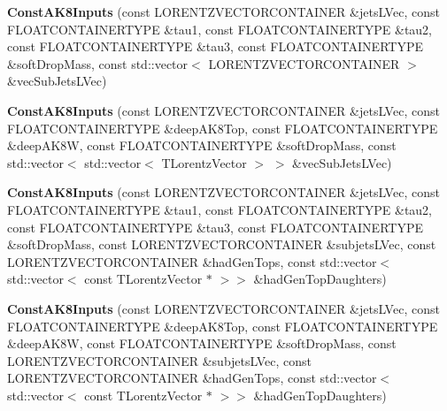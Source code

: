 \begin{DoxyCompactItemize}
\item 
\hypertarget{classttUtility_1_1ConstAK8Inputs_aab5da3d6e7ce53451fb17b1b45f7b957}{{\bfseries Const\-A\-K8\-Inputs} (const L\-O\-R\-E\-N\-T\-Z\-V\-E\-C\-T\-O\-R\-C\-O\-N\-T\-A\-I\-N\-E\-R \&jets\-L\-Vec, const F\-L\-O\-A\-T\-C\-O\-N\-T\-A\-I\-N\-E\-R\-T\-Y\-P\-E \&tau1, const F\-L\-O\-A\-T\-C\-O\-N\-T\-A\-I\-N\-E\-R\-T\-Y\-P\-E \&tau2, const F\-L\-O\-A\-T\-C\-O\-N\-T\-A\-I\-N\-E\-R\-T\-Y\-P\-E \&tau3, const F\-L\-O\-A\-T\-C\-O\-N\-T\-A\-I\-N\-E\-R\-T\-Y\-P\-E \&soft\-Drop\-Mass, const std\-::vector$<$ L\-O\-R\-E\-N\-T\-Z\-V\-E\-C\-T\-O\-R\-C\-O\-N\-T\-A\-I\-N\-E\-R $>$ \&vec\-Sub\-Jets\-L\-Vec)}\label{classttUtility_1_1ConstAK8Inputs_aab5da3d6e7ce53451fb17b1b45f7b957}

\item 
\hypertarget{classttUtility_1_1ConstAK8Inputs_a3dc8cd9d418163e8d9c8fccb666cc74a}{{\bfseries Const\-A\-K8\-Inputs} (const L\-O\-R\-E\-N\-T\-Z\-V\-E\-C\-T\-O\-R\-C\-O\-N\-T\-A\-I\-N\-E\-R \&jets\-L\-Vec, const F\-L\-O\-A\-T\-C\-O\-N\-T\-A\-I\-N\-E\-R\-T\-Y\-P\-E \&deep\-A\-K8\-Top, const F\-L\-O\-A\-T\-C\-O\-N\-T\-A\-I\-N\-E\-R\-T\-Y\-P\-E \&deep\-A\-K8\-W, const F\-L\-O\-A\-T\-C\-O\-N\-T\-A\-I\-N\-E\-R\-T\-Y\-P\-E \&soft\-Drop\-Mass, const std\-::vector$<$ std\-::vector$<$ T\-Lorentz\-Vector $>$ $>$ \&vec\-Sub\-Jets\-L\-Vec)}\label{classttUtility_1_1ConstAK8Inputs_a3dc8cd9d418163e8d9c8fccb666cc74a}

\item 
\hypertarget{classttUtility_1_1ConstAK8Inputs_a0cc1084d9925438c7d6a2b29fc670eb1}{{\bfseries Const\-A\-K8\-Inputs} (const L\-O\-R\-E\-N\-T\-Z\-V\-E\-C\-T\-O\-R\-C\-O\-N\-T\-A\-I\-N\-E\-R \&jets\-L\-Vec, const F\-L\-O\-A\-T\-C\-O\-N\-T\-A\-I\-N\-E\-R\-T\-Y\-P\-E \&tau1, const F\-L\-O\-A\-T\-C\-O\-N\-T\-A\-I\-N\-E\-R\-T\-Y\-P\-E \&tau2, const F\-L\-O\-A\-T\-C\-O\-N\-T\-A\-I\-N\-E\-R\-T\-Y\-P\-E \&tau3, const F\-L\-O\-A\-T\-C\-O\-N\-T\-A\-I\-N\-E\-R\-T\-Y\-P\-E \&soft\-Drop\-Mass, const L\-O\-R\-E\-N\-T\-Z\-V\-E\-C\-T\-O\-R\-C\-O\-N\-T\-A\-I\-N\-E\-R \&subjets\-L\-Vec, const L\-O\-R\-E\-N\-T\-Z\-V\-E\-C\-T\-O\-R\-C\-O\-N\-T\-A\-I\-N\-E\-R \&had\-Gen\-Tops, const std\-::vector$<$ std\-::vector$<$ const T\-Lorentz\-Vector $\ast$ $>$$>$ \&had\-Gen\-Top\-Daughters)}\label{classttUtility_1_1ConstAK8Inputs_a0cc1084d9925438c7d6a2b29fc670eb1}

\item 
\hypertarget{classttUtility_1_1ConstAK8Inputs_a98d56ee8802747a495a78e8d39587184}{{\bfseries Const\-A\-K8\-Inputs} (const L\-O\-R\-E\-N\-T\-Z\-V\-E\-C\-T\-O\-R\-C\-O\-N\-T\-A\-I\-N\-E\-R \&jets\-L\-Vec, const F\-L\-O\-A\-T\-C\-O\-N\-T\-A\-I\-N\-E\-R\-T\-Y\-P\-E \&deep\-A\-K8\-Top, const F\-L\-O\-A\-T\-C\-O\-N\-T\-A\-I\-N\-E\-R\-T\-Y\-P\-E \&deep\-A\-K8\-W, const F\-L\-O\-A\-T\-C\-O\-N\-T\-A\-I\-N\-E\-R\-T\-Y\-P\-E \&soft\-Drop\-Mass, const L\-O\-R\-E\-N\-T\-Z\-V\-E\-C\-T\-O\-R\-C\-O\-N\-T\-A\-I\-N\-E\-R \&subjets\-L\-Vec, const L\-O\-R\-E\-N\-T\-Z\-V\-E\-C\-T\-O\-R\-C\-O\-N\-T\-A\-I\-N\-E\-R \&had\-Gen\-Tops, const std\-::vector$<$ std\-::vector$<$ const T\-Lorentz\-Vector $\ast$ $>$$>$ \&had\-Gen\-Top\-Daughters)}\label{classttUtility_1_1ConstAK8Inputs_a98d56ee8802747a495a78e8d39587184}


\end{DoxyCompactItemize}
